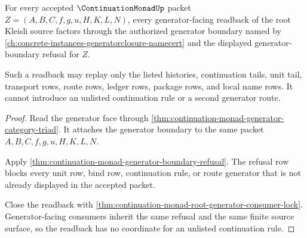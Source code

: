 \begin{theorem}
\label{thm:continuation-monad-root-generator-boundary-readback}
For every accepted $\ContinuationMonadUp$ packet $Z=(A,B,C,f,g,u,H,K,L,N)$, every generator-facing readback of the root Kleisli source factors through the authorized generator boundary named by \autoref{ch:concrete-instances-generatorclosure-namecert} and the displayed generator-boundary refusal for $Z$.

Such a readback may replay only the listed histories, continuation tails, unit tail, transport rows, route rows, ledger rows, package rows, and local name rows. It cannot introduce an unlisted continuation rule or a second generator route.
\end{theorem}
\begin{proof}
Read the generator face through \autoref{thm:continuation-monad-generator-category-triad}. It attaches the generator boundary to the same packet $A,B,C,f,g,u,H,K,L,N$.

Apply \autoref{thm:continuation-monad-generator-boundary-refusal}. The refusal row blocks every unit row, bind row, continuation rule, or route generator that is not already displayed in the accepted packet.

Close the readback with \autoref{thm:continuation-monad-root-generator-consumer-lock}. Generator-facing consumers inherit the same refusal and the same finite source surface, so the readback has no coordinate for an unlisted continuation rule.
\end{proof}

